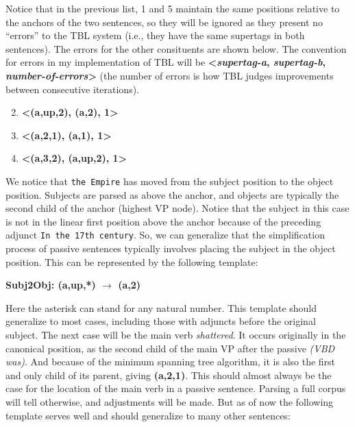 \documentclass{article}
\begin{document}
Notice that in the previous list, 1 and 5 maintain the same positions relative to the anchors of the two sentences, so they will be ignored as they present no ``errors'' to the TBL system (i.e., they have the same supertags in both sentences). The errors for the other consituents are shown below. The convention for errors in my implementation of TBL will be \textbf{\textless\textit{supertag-a}, \textit{supertag-b}, \textit{number-of-errors}\textgreater} (the number of errors is how TBL judges improvements between consecutive iterations).

\begin{enumerate}
\setcounter{enumi}{1}
\item \textbf{\textless(a,up,2), (a,2), 1\textgreater}
\item \textbf{\textless(a,2,1), (a,1), 1\textgreater}
\item \textbf{\textless(a,3,2), (a,up,2), 1\textgreater}
\end{enumerate}

We notice that \texttt{the Empire} has moved from the subject position to the object position. Subjects are parsed as above the anchor, and objects are typically the second child of the anchor (highest VP node). Notice that the subject in this case is not in the linear first position above the anchor because of the preceding adjunct \texttt{In the 17th century}. So, we can generalize that the simplification process of passive sentences typically involves placing the subject in the object position. This can be represented by the following template:

\begin{center}
\textbf{Subj2Obj: (a,up,*) $\rightarrow$ (a,2)}
\end{center}

Here the asterisk can stand for any natural number. This template should generalize to most cases, including those with adjuncts before the original subject. The next case will be the main verb \textit{shattered}. It occurs originally in the canonical position, as the second child of the main VP after the passive \textit{(VBD was)}. And because of the minimum spanning tree algorithm, it is also the first and only child of its parent, giving \textbf{(a,2,1)}. This should almost always be the case for the location of the main verb in a passive sentence. Parsing a full corpus will tell otherwise, and adjustments will be made. But as of now the following template serves well and should generalize to many other sentences:
\end{document}
